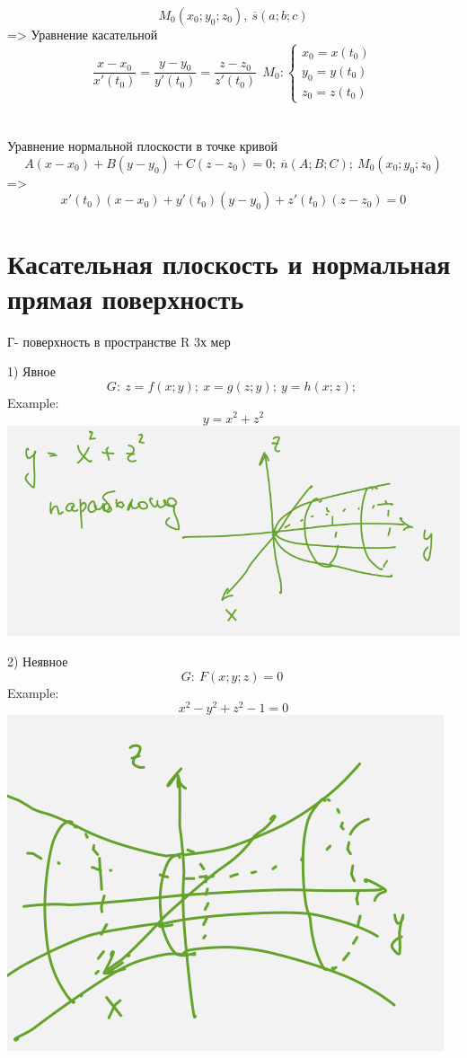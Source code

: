\documentclass{article}
\begin{document}
\begin{equation*}
    M_0(x_0;y_0;z_0), \ \overline{s}(a;b;c)
\end{equation*}
=>
Уравнение касательной
\begin{equation*}
    \frac{x-x_0}{x'(t_0)} = \frac{y-y_0}{y'(t_0)} = \frac{z-z_0}{z'(t_0)} \ \ M_0:
    \begin{cases}
        x_0 = x(t_0)\\
        y_0=y(t_0)\\
        z_0=z(t_0)
    \end{cases}
\end{equation*}
\\ \\
Уравнение нормальной плоскости в точке кривой
\begin{equation*}
    A(x-x_0)+B(y-y_0)+C(z-z_0) = 0;\ \overline{n}(A;B;C);\ M_0(x_0;y_0;z_0)
\end{equation*}
=>
\begin{equation*}
    x'(t_0)(x-x_0)+y'(t_0)(y-y_0)+z'(t_0)(z-z_0) = 0
\end{equation*}
\section{Касательная плоскость и нормальная прямая поверхность}
Г- поверхность в пространстве R 3х мер

1) Явное
\begin{equation*}
    G:\ z = f(x;y);\ x = g(z;y);\ y = h(x;z);\ 
\end{equation*}
Example:
\begin{equation*}
    y = x^2 +z^2 
\end{equation*}
\includegraphics[width=.3\textwidth]{parabol.png}

2) Неявное
\begin{equation*}
    G:\ F(x;y;z)=0\ 
\end{equation*} 
Example:
\begin{equation*}
    x^2-y^2+z^2-1=0
\end{equation*}
\includegraphics[width=.3\textwidth]{parabalobel.png} 
\end{document}

